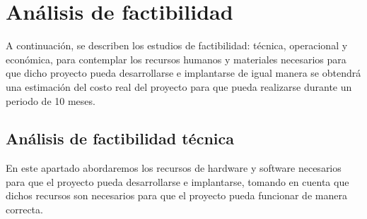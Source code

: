\section{An{á}lisis de factibilidad}

A continuación, se describen los estudios de factibilidad: técnica, operacional y económica, para contemplar los recursos humanos y materiales necesarios para que dicho proyecto pueda desarrollarse e implantarse de igual manera se obtendrá una estimación del costo real del proyecto para que pueda realizarse durante un periodo de 10 meses. \\

\subsection{Análisis de factibilidad técnica}

En este apartado abordaremos los recursos de hardware y software necesarios para que el proyecto pueda desarrollarse e implantarse, tomando en cuenta que dichos recursos son necesarios para que el proyecto pueda funcionar de manera correcta. \\

